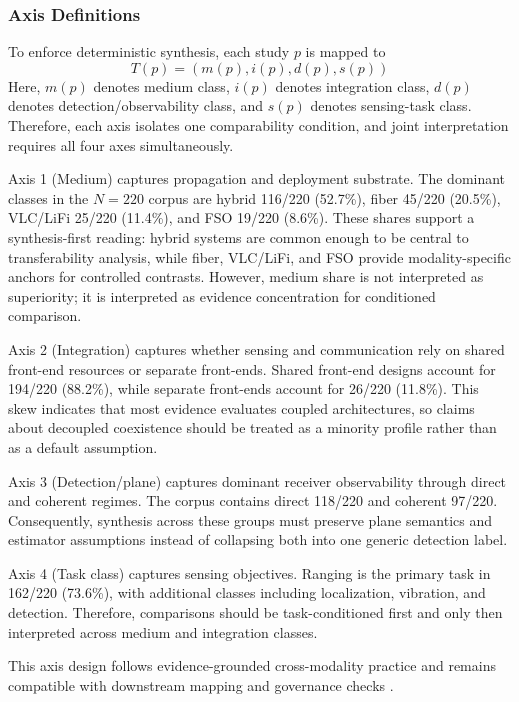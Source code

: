 \documentclass[lettersize,journal]{IEEEtran}
\begin{document}
\subsubsection{Axis Definitions}
To enforce deterministic synthesis, each study $p$ is mapped to
\begin{equation}
T(p) = (m(p), i(p), d(p), s(p))
\end{equation}
Here, $m(p)$ denotes medium class, $i(p)$ denotes integration class, $d(p)$ denotes detection/observability class, and $s(p)$ denotes sensing-task class. Therefore, each axis isolates one comparability condition, and joint interpretation requires all four axes simultaneously.

Axis 1 (Medium) captures propagation and deployment substrate. The dominant classes in the $N=220$ corpus are hybrid 116/220 (52.7\%), fiber 45/220 (20.5\%), VLC/LiFi 25/220 (11.4\%), and FSO 19/220 (8.6\%). These shares support a synthesis-first reading: hybrid systems are common enough to be central to transferability analysis, while fiber, VLC/LiFi, and FSO provide modality-specific anchors for controlled contrasts. However, medium share is not interpreted as superiority; it is interpreted as evidence concentration for conditioned comparison.

Axis 2 (Integration) captures whether sensing and communication rely on shared front-end resources or separate front-ends. Shared front-end designs account for 194/220 (88.2\%), while separate front-ends account for 26/220 (11.8\%). This skew indicates that most evidence evaluates coupled architectures, so claims about decoupled coexistence should be treated as a minority profile rather than as a default assumption.

Axis 3 (Detection/plane) captures dominant receiver observability through direct and coherent regimes. The corpus contains direct 118/220 and coherent 97/220. Consequently, synthesis across these groups must preserve plane semantics and estimator assumptions instead of collapsing both into one generic detection label.

Axis 4 (Task class) captures sensing objectives. Ranging is the primary task in 162/220 (73.6\%), with additional classes including localization, vibration, and detection. Therefore, comparisons should be task-conditioned first and only then interpreted across medium and integration classes.

This axis design follows evidence-grounded cross-modality practice and remains compatible with downstream mapping and governance checks \cite{O_ISAC_021,O_ISAC_039,O_ISAC_077}.
\end{document}
